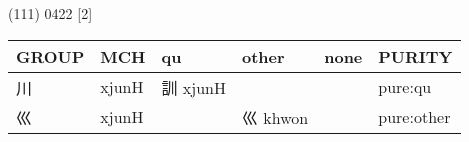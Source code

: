 \documentclass[14pt,a4paper]{scrartcl}
\begin{document}
(111) 0422 {[}2{]}

\begin{longtable}[c]{@{}llllll@{}}
\toprule
\begin{minipage}[b]{0.14\columnwidth}\raggedright\strut
GROUP
\strut\end{minipage} &
\begin{minipage}[b]{0.14\columnwidth}\raggedright\strut
MCH
\strut\end{minipage} &
\begin{minipage}[b]{0.14\columnwidth}\raggedright\strut
qu
\strut\end{minipage} &
\begin{minipage}[b]{0.14\columnwidth}\raggedright\strut
other
\strut\end{minipage} &
\begin{minipage}[b]{0.14\columnwidth}\raggedright\strut
none
\strut\end{minipage} &
\begin{minipage}[b]{0.14\columnwidth}\raggedright\strut
PURITY
\strut\end{minipage}\tabularnewline
\midrule
\endhead
\begin{minipage}[t]{0.14\columnwidth}\raggedright\strut
川
\strut\end{minipage} &
\begin{minipage}[t]{0.14\columnwidth}\raggedright\strut
xjunH
\strut\end{minipage} &
\begin{minipage}[t]{0.14\columnwidth}\raggedright\strut
訓 xjunH
\strut\end{minipage} &
\begin{minipage}[t]{0.14\columnwidth}\raggedright\strut
\strut\end{minipage} &
\begin{minipage}[t]{0.14\columnwidth}\raggedright\strut
\strut\end{minipage} &
\begin{minipage}[t]{0.14\columnwidth}\raggedright\strut
pure:qu
\strut\end{minipage}\tabularnewline
\begin{minipage}[t]{0.14\columnwidth}\raggedright\strut
巛
\strut\end{minipage} &
\begin{minipage}[t]{0.14\columnwidth}\raggedright\strut
xjunH
\strut\end{minipage} &
\begin{minipage}[t]{0.14\columnwidth}\raggedright\strut
\strut\end{minipage} &
\begin{minipage}[t]{0.14\columnwidth}\raggedright\strut
巛 khwon
\strut\end{minipage} &
\begin{minipage}[t]{0.14\columnwidth}\raggedright\strut
\strut\end{minipage} &
\begin{minipage}[t]{0.14\columnwidth}\raggedright\strut
pure:other
\strut\end{minipage}\tabularnewline
\bottomrule
\end{longtable}
\end{document}
